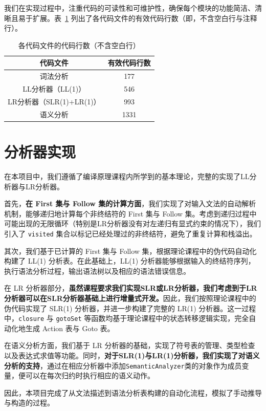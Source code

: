 \documentclass[UTF8,openany]{ctexbook}
\begin{document}
我们在实现过程中，注重代码的可读性和可维护性，确保每个模块的功能简洁、清晰且易于扩展。表~\ref{tab:code_lines} 列出了各代码文件的有效代码行数（即，不含空白行与注释行）。

\begin{table}[htbp]
\centering
\caption{各代码文件的代码行数（不含空白行）}
\label{tab:code_lines}
\begin{tabular*}{0.7\textwidth}{@{\extracolsep{\fill}}cc}
\toprule
代码文件 & 有效代码行数 \\
\midrule
词法分析 & 177 \\
LL分析器（LL(1)） & 546 \\
LR分析器（SLR(1)+LR(1)） & 993 \\
语义分析 & 1331 \\
\bottomrule
\end{tabular*}
\end{table}


\section{分析器实现}

在本项目中，我们遵循了编译原理课程内所学到的基本理论，完整的实现了LL分析器与LR分析器。

首先，\textbf{在 First 集与 Follow 集的计算方面}，我们实现了对输入文法的自动解析机制，能够递归地计算每个非终结符的 First 集与 Follow 集。考虑到递归过程中可能出现的无限循环（特别是LR分析器没有对左递归有显式约束的情况下），我们引入了 \texttt{visited} 集合以标记已经处理过的非终结符，避免了重复计算和栈溢出。

其次，我们基于已计算的 First 集与 Follow 集，根据理论课程中的伪代码自动化构建了 LL(1) 分析表。在此基础上，LL(1) 分析器能够根据输入的终结符序列，执行语法分析过程，输出语法树以及相应的语法错误信息。

在 LR 分析器部分，\textbf{虽然课程要求我们实现SLR或LR分析器，我们考虑到于LR分析器可以在SLR分析器基础上进行增量式开发。}因此，我们按照理论课程中的伪代码实现了 SLR(1) 分析器，并进一步构建了完整的 LR(1) 分析器。这一过程中，\texttt{closure} 与 \texttt{gotoSet} 等函数均基于理论课程中的状态转移逻辑实现，完全自动化地生成 Action 表与 Goto 表。

在语义分析方面，我们基于 LR 分析器的基础，实现了符号表的管理、类型检查以及表达式求值等功能。同时，\textbf{对于SLR(1)与LR(1)分析器，我们实现了对语义分析的支持}，通过在相应分析器中添加\texttt{SemanticAnalyzer}类的对象作为成员变量，便可以在每次归约时执行相应的语义动作。

因此，本项目完成了从文法描述到语法分析表构建的自动化流程，模拟了手动推导与构造的过程。
\end{document}
